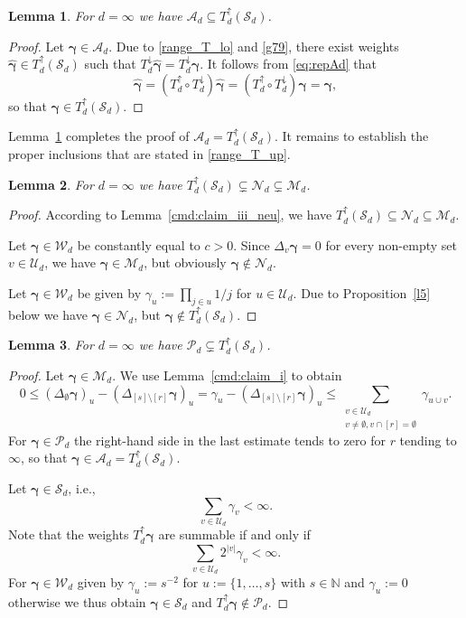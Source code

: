 \documentclass{article}
\newcommand{\N}  {{\mathbb N}}
\newcommand{\bg}{{\boldsymbol{\gamma}}}
\newcommand{\PP} {\mathcal{P}}
\newcommand{\U}  {\mathcal{U}}
\newcommand{\W}  {\mathcal{W}}
\newcommand{\M}  {\mathcal{M}}
\newcommand{\mN}  {\mathcal{N}}
\newcommand{\SSS}{\mathcal{S}}
\newcommand{\A}{\mathcal{A}}
\newcommand{\lo}{\downarrow}
\newcommand{\up}{\uparrow}
\theoremstyle{plain}
\newtheorem{lemma}{Lemma}
\theoremstyle{definition}
\begin{document}
\begin{lemma}\label{l32}
For $d = \infty$ 
we have $\A_d \subseteq T^\up_d(\SSS_d)$.
\end{lemma}


\begin{proof}
Let $\bg \in \A_d$.
Due to \eqref{range_T_lo} and \eqref{g79}, there exist weights 
$\widehat{\bg} \in T^\up_d(\SSS_d)$ such that 
$T^\lo_{d} \widehat{\bg} = T^\lo_d \bg$.  It follows
from \eqref{eq:repAd} that
\[
\widehat{\bg} = 
\left( T^\up_d \circ T^\lo_d \right) \widehat{\bg}
=
\left( T^\up_d \circ T^\lo_d \right) \bg = \bg,
\]
so that $\bg \in T^\up_d(\SSS_d)$.
\end{proof}

Lemma~\ref{l32} completes the proof of 
$\A_d = T^\up_d(\SSS_d)$.
It remains to establish the proper inclusions that are stated
in \eqref{range_T_up}.

\begin{lemma}\label{l35}
For $d = \infty$ we have
$T^\up_{d} (\SSS_{d}) \subsetneq \mN_d \subsetneq \M_d$.
\end{lemma}

\begin{proof}
According to Lemma~\ref{cmd:claim_iii_neu}, we have
$T^\up_{d} (\SSS_{d}) \subseteq \mN_d \subseteq \M_d$.

Let $\bg \in \W_d$ be constantly equal to $c > 0$. 
Since $\Delta_v \bg = 0$ for every 
non-empty set $v \in \U_d$, we have $\bg \in \M_d$,
but obviously $\bg \notin \mN_d$.

Let $\bg \in \W_d$ be given by $\gamma_u := \prod_{j \in u} 1/j$
for $u \in \U_d$.
Due to Proposition~\ref{l5} below we have 
$\bg \in \mN_d$, but $\bg \notin T^\up_d (\SSS_d)$.
\end{proof}

\begin{lemma}\label{l36}
For $d = \infty$ we have
$\PP_d \subsetneq T^\up_{d} (\SSS_{d})$.
\end{lemma}

\begin{proof}
Let $\bg \in \M_d$.
We use Lemma~\ref{cmd:claim_i} to obtain
\begin{equation*}
0 \leq 
\left( \Delta_\emptyset \bg \right)_u -
\left( \Delta_{[s] \setminus [r]} \bg \right)_u 
= \gamma_u -
\left( \Delta_{[s] \setminus [r]} \bg \right)_u 
\leq \sum_{\substack{v \in \U_d \\  
v \neq \emptyset,v \cap [r] = \emptyset}} \gamma_{u\cup v}.
\end{equation*}
For $\bg \in \PP_d$
the right-hand side in the last estimate tends to zero for 
$r$ tending to $\infty$,
so that $\bg \in \A_d = T^\up_d(\SSS_d)$.

Let $\bg \in \SSS_d$, i.e.,
\[
\sum_{v\in \U_{d}} 
\gamma_v < \infty.
\]
Note that the weights $T^\up_d \bg$ are summable 
if and only if 
\begin{equation*}
\sum_{v\in \U_{d}} 2^{\left|v\right|}\gamma_v < \infty.
\end{equation*}
For $\bg \in \W_d$ given by
$\gamma_u := s^{-2}$ for 
$u := \{1,\dots,s\}$ with $s \in \N$ and $\gamma_u := 0$
otherwise we thus obtain $\bg \in \SSS_d$ and $T^\up_d \bg \not\in \PP_d$.
\end{proof}
\end{document}

